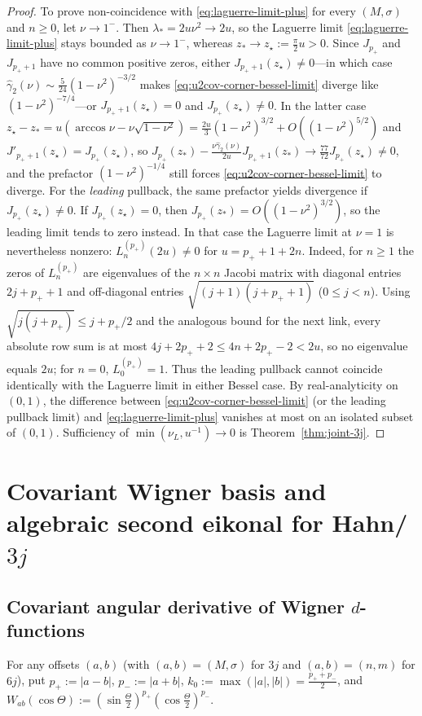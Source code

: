 \documentclass[11pt]{article}
\theoremstyle{definition}
\theoremstyle{remark}
\renewcommand{\_}{\oldunderscore\penalty0\hskip0pt\relax}
\begin{document}
\begin{proof}
To prove non-coincidence with \eqref{eq:laguerre-limit-plus} for every $(M,\sigma)$ and $n\ge 0$, let $\nu\to 1^-$. Then
  $\lambda_*=2u\nu^2\to 2u$, so the Laguerre limit \eqref{eq:laguerre-limit-plus} stays bounded as $\nu\to 1^-$, whereas $z_*\to
  z_\star:=\frac{\pi}{2}u>0$. Since $J_{p_+}$ and $J_{p_++1}$ have no common positive zeros, either $J_{p_++1}(z_\star)\ne
  0$---in which case $\widehat{\gamma}_2(\nu)\sim\frac{5}{24}(1-\nu^2)^{-3/2}$ makes \eqref{eq:u2cov-corner-bessel-limit} diverge
  like $(1-\nu^2)^{-7/4}$---or $J_{p_++1}(z_\star)=0$ and $J_{p_+}(z_\star)\ne 0$. In the latter case
  $z_\star-z_*=u(\arccos\nu-\nu\sqrt{1-\nu^2})=\frac{2u}{3}(1-\nu^2)^{3/2}+O((1-\nu^2)^{5/2})$ and
  $J'_{p_++1}(z_\star)=J_{p_+}(z_\star)$, so
  $J_{p_+}(z_*)-\frac{\nu\widehat{\gamma}_2(\nu)}{2u}J_{p_++1}(z_*)\to\frac{77}{72}J_{p_+}(z_\star)\ne 0$, and the prefactor
  $(1-\nu^2)^{-1/4}$ still forces \eqref{eq:u2cov-corner-bessel-limit} to diverge. For the \emph{leading} pullback, the same
  prefactor yields divergence if $J_{p_+}(z_\star)\ne0$. If $J_{p_+}(z_\star)=0$, then $J_{p_+}(z_*)=O((1-\nu^2)^{3/2})$, so the
  leading limit tends to zero instead. In that case the Laguerre limit at $\nu=1$ is nevertheless nonzero: $L_n^{(p_+)}(2u)\ne0$
  for $u=p_++1+2n$. Indeed, for $n\ge1$ the zeros of $L_n^{(p_+)}$ are eigenvalues of the $n\times n$ Jacobi matrix with diagonal
  entries $2j+p_++1$ and off-diagonal entries $\sqrt{(j+1)(j+p_++1)}$ ($0\le j<n$). Using $\sqrt{j(j+p_+)}\le j+p_+/2$ and the
  analogous bound for the next link, every absolute row sum is at most $4j+2p_++2\le4n+2p_+-2<2u$, so no eigenvalue equals $2u$;
  for $n=0$, $L_0^{(p_+)}=1$. Thus the leading pullback cannot coincide identically with the Laguerre limit in either Bessel
  case. By real-analyticity on $(0,1)$, the difference between \eqref{eq:u2cov-corner-bessel-limit} (or the leading pullback
  limit) and \eqref{eq:laguerre-limit-plus} vanishes at most on an isolated subset of $(0,1)$. Sufficiency of
  $\min(\nu_L,u^{-1})\to 0$ is Theorem~\ref{thm:joint-3j}.
\end{proof}

\section{Covariant Wigner basis and algebraic second eikonal for Hahn/\texorpdfstring{$3j$}{3j}}
\label{sec:covariant-3j}

\subsection{Covariant angular derivative of Wigner \texorpdfstring{$d$}{d}-functions}
For any offsets $(a,b)$ (with $(a,b)=(M,\sigma)$ for $3j$ and $(a,b)=(n,m)$ for $6j$), put $p_+:=|a-b|$, $p_-:=|a+b|$,
  $k_0:=\max(|a|,|b|)=\frac{p_++p_-}{2}$, and $W_{ab}(\cos\Theta):=(\sin\frac{\Theta}{2})^{p_+}(\cos\frac{\Theta}{2})^{p_-}$.
\end{document}
